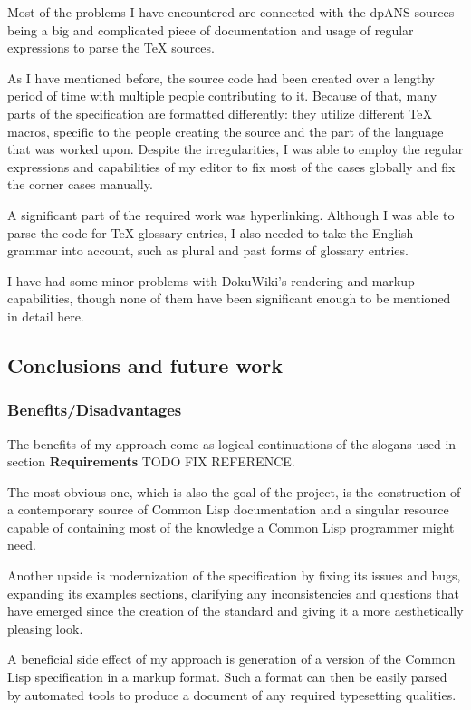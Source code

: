 Most of the problems I have encountered are connected with the dpANS
sources being a big and complicated piece of documentation and usage of
regular expressions to parse the TeX sources.

As I have mentioned before, the source code had been created over a
lengthy period of time with multiple people contributing to it. Because
of that, many parts of the specification are formatted differently: they
utilize different TeX macros, specific to the people creating the source
and the part of the language that was worked upon. Despite the
irregularities, I was able to employ the regular expressions and
capabilities of my editor to fix most of the cases globally and fix the
corner cases manually.

A significant part of the required work was hyperlinking. Although I was
able to parse the code for TeX glossary entries, I also needed to take
the English grammar into account, such as plural and past forms of
glossary entries.

I have had some minor problems with DokuWiki's rendering and markup
capabilities, though none of them have been significant enough to be
mentioned in detail here.

\subsection{Conclusions and future
work}\label{conclusions-and-future-work}

\subsubsection{Benefits/Disadvantages}\label{benefitsdisadvantages}

The benefits of my approach come as logical continuations of the slogans
used in section \textbf{Requirements} TODO FIX REFERENCE.

The most obvious one, which is also the goal of the project, is the
construction of a contemporary source of Common Lisp documentation and a
singular resource capable of containing most of the knowledge a Common
Lisp programmer might need.

Another upside is modernization of the specification by fixing its
issues and bugs, expanding its examples sections, clarifying any
inconsistencies and questions that have emerged since the creation of
the standard and giving it a more aesthetically pleasing look.

A beneficial side effect of my approach is generation of a version of
the Common Lisp specification in a markup format. Such a format can then
be easily parsed by automated tools to produce a document of any
required typesetting qualities.

